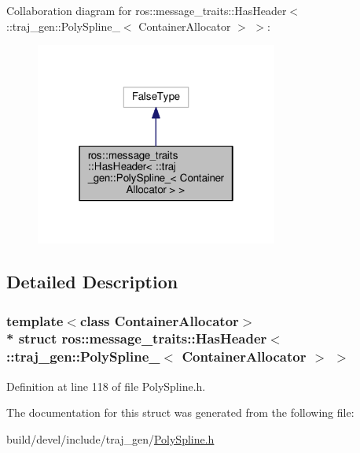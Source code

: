 Collaboration diagram for ros\+:\+:message\+\_\+traits\+:\+:Has\+Header$<$ \+:\+:traj\+\_\+gen\+:\+:Poly\+Spline\+\_\+$<$ Container\+Allocator $>$ $>$\+:
\nopagebreak
\begin{figure}[H]
\begin{center}
\leavevmode
\includegraphics[width=226pt]{structros_1_1message__traits_1_1_has_header_3_01_1_1traj__gen_1_1_poly_spline___3_01_container_allocator_01_4_01_4__coll__graph}
\end{center}
\end{figure}


\subsection{Detailed Description}
\subsubsection*{template$<$class Container\+Allocator$>$\\*
struct ros\+::message\+\_\+traits\+::\+Has\+Header$<$ \+::traj\+\_\+gen\+::\+Poly\+Spline\+\_\+$<$ Container\+Allocator $>$ $>$}



Definition at line 118 of file Poly\+Spline.\+h.



The documentation for this struct was generated from the following file\+:\begin{DoxyCompactItemize}
\item 
build/devel/include/traj\+\_\+gen/\hyperlink{_poly_spline_8h}{Poly\+Spline.\+h}\end{DoxyCompactItemize}
